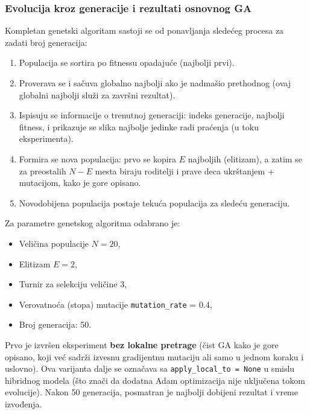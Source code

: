 \documentclass[a4paper,12pt]{article}
\begin{document}
\subsubsection{Evolucija kroz generacije i rezultati osnovnog GA}
Kompletan genetski algoritam sastoji se od ponavljanja sledećeg procesa za zadati broj generacija:
\begin{enumerate}
\item Populacija se sortira po fitnessu opadajuće (najbolji prvi).
\item Proverava se i sačuva globalno najbolji ako je nadmašio prethodnog (ovaj globalni najbolji služi za završni rezultat).
\item Ispisuju se informacije o trenutnoj generaciji: indeks generacije, najbolji fitness, i prikazuje se slika najbolje jedinke radi praćenja (u toku eksperimenta).
\item Formira se nova populacija: prvo se kopira $E$ najboljih (elitizam), a zatim se za preostalih $N-E$ mesta biraju roditelji i prave deca ukrštanjem + mutacijom, kako je gore opisano.
\item Novodobijena populacija postaje tekuća populacija za sledeću generaciju.
\end{enumerate}

Za parametre genetskog algoritma odabrano je:
\begin{itemize}
\item Veličina populacije $N = 20$,
\item Elitizam $E = 2$,
\item Turnir za selekciju veličine 3,
\item Verovatnoća (stopa) mutacije \texttt{mutation\_rate} = 0.4,
\item Broj generacija: 50.
\end{itemize}

Prvo je izvršen eksperiment \textbf{bez lokalne pretrage} (čist GA kako je gore opisano, koji već sadrži izvesnu gradijentnu mutaciju ali samo u jednom koraku i uslovno). Ova varijanta dalje se označava sa \texttt{apply\_local\_to = None} u smislu hibridnog modela (što znači da dodatna Adam optimizacija nije uključena tokom evolucije). Nakon 50 generacija, posmatran je najbolji dobijeni rezultat i vreme izvođenja.
\end{document}

